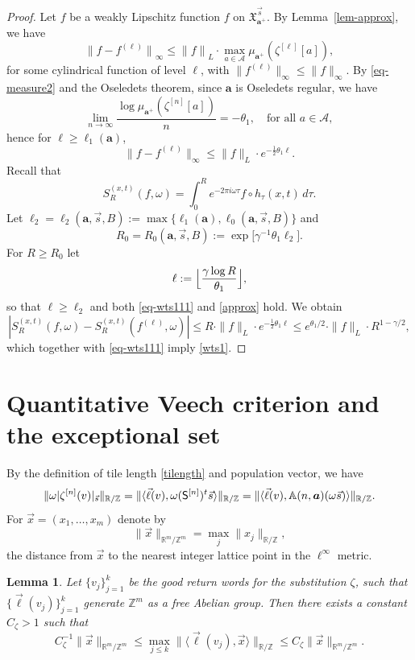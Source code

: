 \documentclass[11pt]{article}
\numberwithin{equation}{section}\newcommand{\Relation}[2][]{}\newtheorem*{prop*}{Proposition}
\let\mathcal\mathscr
\theoremstyle{plain}
\newtheorem{lemma}[theorem]{Lemma}
\theoremstyle{definition}
\newcommand\half{\frac{1}{2}}
\newcommand\bom{{\boldsymbol a}}\let\ba\bom
\let\gam\gamma
\let\om\omega
\newcommand\Xx{\mathfrak{X}}
\newcommand\Ak{\mathcal{A}}
\newcommand\Aa{\mathbb{A}}
\newcommand{\R}{\mathbb{R}}
\newcommand{\Z}{\mathbb{Z}}
\newcommand\Sf{{\sf S}}
\newcommand\be{\begin{equation}}
\newcommand\ee{\end{equation}}
\begin{document}
\begin{proof}
Let $f$ be a weakly Lipschitz function $f$ on $\Xx_{\bom^+}^{\vec{s}}$.
By Lemma~\ref{lem-approx}, we have
\[
{\|f - f^{(\ell)}\|}_\infty \le {\|f\|}_L\cdot \max_{a\in \Ak} \mu_{\bom^+}(\zeta^{[\ell]}[a]),
\]
for some cylindrical function of level $\ell$, with $\|f^{(\ell)}\|_\infty \le \|f\|_\infty$. By \eqref{eq-measure2} and the Oseledets theorem,
since $\bom$ is Oseledets regular, we have
\[
\lim _{n\to \infty} \frac{\log \mu_{\bom^+}(\zeta^{[n]}[a])}{n} = -\theta_1,\quad \text{for all }a\in \Ak,
\]
hence for $\ell\ge \ell_1(\bom)$,
\be \label{approx}
\|f-f^{(\ell)}\|_\infty \le \|f\|_L\cdot e^{-\half\theta_1\ell}.
\ee
Recall that
\[
S_R^{(x,t)}(f,\om) = \int_0^R e^{-2\pi i \om \tau} f\circ h_\tau(x,t)\,d\tau.
\]
Let $\ell_2=\ell_2(\bom,\vec s,B):= \max\{\ell_1(\bom), \ell_0(\bom,\vec s,B)\}$ and
\[
R_0=R_0(\bom,\vec s,B) := \exp\bigl[\gam^{-1}\theta_1 \ell_2\bigr].
\]
For $R\ge R_0$ let
\be\label{def-ell}
\ell := \Bigl\lfloor \frac{\gam \log R}{\theta_1}\Bigr\rfloor,
\ee
so that $\ell\ge \ell_2$ and both \eqref{eq-wts111} and \eqref{approx} hold. We obtain
\[
|S_R^{(x,t)}(f,\om) - S_R^{(x,t)}(f^{(\ell)},\om)| \le R\cdot \|f\|_L \cdot e^{-\half\theta_1 \ell} \le e^{\theta_1/2}\cdot \|f\|_L\cdot R^{1-\gam/2},
\]
which together with \eqref{eq-wts111} imply \eqref{wts1}.
\end{proof}

\section{Quantitative Veech criterion and the exceptional set}

By the definition of tile length \eqref{tilength} and population vector, we have
\[
\|\om|\zeta^{[n]}(v)|_{\vec{s}}\|_{\R/\Z} = \|\langle \vec\ell(v), \om (\Sf^{[n]})^t \vec{s} \rangle \|_{\R/\Z} = \|\langle \vec\ell(v), \Aa(n,\bom) (\om\vec{s} )\rangle \|_{\R/\Z}.
\]
For $\vec{x} = (x_1,\ldots,x_m)$ denote by
\[
\|\vec{x}\|_{\R^m/\Z^m} = \max_j \|x_j\|_{\R/\Z},
\]
the distance from $\vec x$ to the nearest integer lattice point in the $\ell^\infty$ metric.

\begin{lemma} \label{lem-lattice}
Let $\{v_j\}_{j=1}^k$ be the good return words for the substitution $\zeta$, such that $\{\vec\ell(v_j)\}_{j=1}^k$ generate $\Z^m$ as a free Abelian group. Then there exists a constant
$C_\zeta>1$ such that
\be \label{ineq-lattice}
C_\zeta^{-1} \|\vec x\|_{\R^m/\Z^m}
\le \max_{j\le k} \|\langle \vec\ell(v_j), \vec{x}\rangle \|_{\R/\Z} \le C_\zeta \|\vec x\|_{\R^m/\Z^m}.
\ee
\end{lemma}
\end{document}
